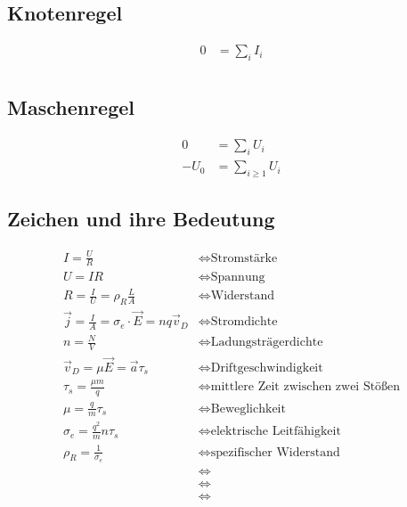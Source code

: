 \documentclass[twocolumn]{summery_3.1}
\begin{document}
\subsection{Knotenregel}
\begin{align*}
    0 &= \sum_i I_i\\
\end{align*}

\subsection{Maschenregel}
\begin{align*}
    0 &= \sum_i U_i\\
    -U_0 &= \sum_{i\ge1} U_i
\end{align*}
 
\subsection{Zeichen und ihre Bedeutung}
\begin{align*}
    I = \frac{U}{R}&\Longleftrightarrow \text{Stromstärke}\\
    U = I R&\Longleftrightarrow \text{Spannung}\\
    R = \frac{I}{U} = \rho_R \frac{L}{A}&\Longleftrightarrow \text{Widerstand}\\
    \vec j = \frac{I}{A} = \sigma_e \cdot \vec E = n q \vec v_D &\Longleftrightarrow \text{Stromdichte}\\
    n = \frac{N}{V}&\Longleftrightarrow \text{Ladungsträgerdichte}\\
    \vec v_D = \mu \vec E = \vec a \tau_s&\Longleftrightarrow \text{Driftgeschwindigkeit}\\
    \tau_s = \frac{\mu m }{q}&\Longleftrightarrow \text{mittlere Zeit zwischen zwei Stößen}\\
    \mu = \frac{q}{m} \tau_s&\Longleftrightarrow \text{Beweglichkeit }\\
    \sigma_e = \frac{q^2}{m}n \tau_s&\Longleftrightarrow \text{elektrische Leitfähigkeit}\\
    \rho_R = \frac{1}{\sigma_e}&\Longleftrightarrow \text{spezifischer Widerstand}\\
    &\Longleftrightarrow \text{}\\
    &\Longleftrightarrow \text{}\\
    &\Longleftrightarrow \text{}\\
\end{align*}
\end{document}
